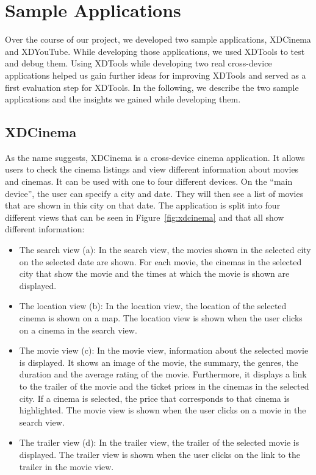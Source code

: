 \chapter{Sample Applications}

Over the course of our project, we developed two sample applications, XDCinema and XDYouTube. While developing those applications, we used XDTools to test and debug them. Using XDTools while developing two real cross-device applications helped us gain further ideas for improving XDTools and served as a first evaluation step for XDTools. In the following, we describe the two sample applications and the insights we gained while developing them.

\section{XDCinema}

As the name suggests, XDCinema is a cross-device cinema application. It allows users to check the cinema listings and view different information about movies and cinemas. It can be used with one to four different devices. On the ``main device'', the user can specify a city and date. They will then see a list of movies that are shown in this city on that date. The application is split into four different views that can be seen in Figure~\ref{fig:xdcinema} and that all show different information:
\begin{itemize}
	\item The search view (a): In the search view, the movies shown in the selected city on the selected date are shown. For each movie, the cinemas in the selected city that show the movie and the times at which the movie is shown are displayed.
	\item The location view (b): In the location view, the location of the selected cinema is shown on a map. The location view is shown when the user clicks on a cinema in the search view.
	\item The movie view (c): In the movie view, information about the selected movie is displayed. It shows an image of the movie, the summary, the genres, the duration and the average rating of the movie. Furthermore, it displays a link to the trailer of the movie and the ticket prices in the cinemas in the selected city. If a cinema is selected, the price that corresponds to that cinema is highlighted. The movie view is shown when the user clicks on a movie in the search view.
	\item The trailer view (d): In the trailer view, the trailer of the selected movie is displayed. The trailer view is shown when the user clicks on the link to the trailer in the movie view.
\end{itemize}


